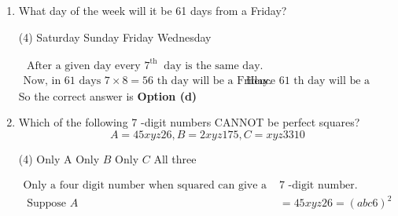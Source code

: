 \begin{enumerate}
	 \begin{tasks}(1)
		\task[\textbf{a.}] At the slowest rate when they are less than $1 \mathrm{~m}$ tall
		\task[\textbf{b.}]At the fastest rate when they are between $1 m$ and $2 m$ tall
		\task[\textbf{c.}]At the fastest rate when they are more than $2 m$ tall
		\task[\textbf{d.}]  At the same rate at all stages
	\end{tasks}
\begin{answer}
From the question we see that $20+50=70$ percent plants have heights more than\\
\begin{figure}[H]
	\centering
	\texttt{[image: Net-D-19-4]}
\end{figure}
in which only $50 \%$ plants have height more than $2 \mathrm{~m}$. Hence plants show maximum rate of increase of height when they are between $1 \mathrm{~m}$ and $2 \mathrm{~m}$.\\
		So the correct answer is \textbf{Option (b)}
\end{answer}
\item  What day of the week will it be 61 days from a Friday?
	 \begin{tasks}(4)
		\task[\textbf{a.}]Saturday
		\task[\textbf{b.}]Sunday
		\task[\textbf{c.}]Friday
		\task[\textbf{d.}] Wednesday
	\end{tasks}
\begin{answer}
	\begin{align*}
\text{ After a given day every $7^{\text {th }}$ day is the same day.}\\
	\text{Now, in 61 days $7 \times 8=56$ th day will be a Friday.}&\text{ Hence 61 th day will be a Wednesday}
	\end{align*}
	So the correct answer is \textbf{Option (d)}
\end{answer}
\item  Which of the following 7 -digit numbers CANNOT be perfect squares?
	$$
	A=45 x y z 26, B=2 x y z 175, C=x y z 3310
	$$
	 \begin{tasks}(4)
		\task[\textbf{a.}] Only A
		\task[\textbf{b.}]Only $B$
		\task[\textbf{c.}]Only $C$
		\task[\textbf{d.}] All three
	\end{tasks}
\begin{answer}
	\begin{align*}
	\text{Only a four digit number when squared can give a }&\text{7 -digit number.}\\
\text{	Suppose }A&=45 x y z 26=(a b c 6)^{2}\\

\end{align*}
\end{answer}
\end{enumerate}
